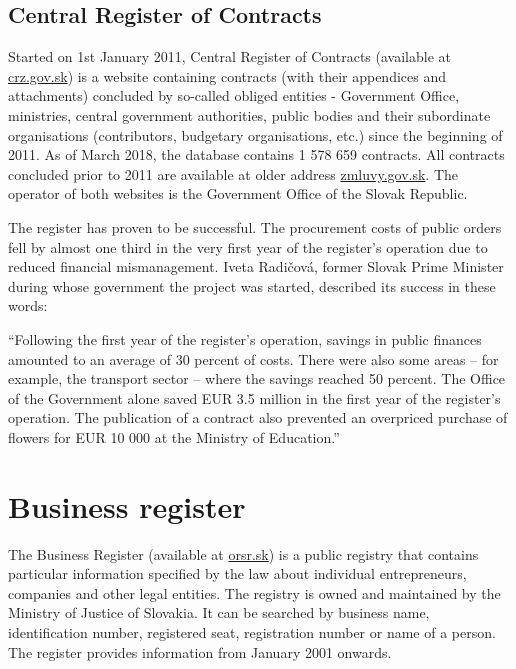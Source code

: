 \documentclass[thesis=B,english]{FITthesis}[2012/06/26]
\begin{document}
    \subsection{Central Register of Contracts}
    \label{crz}
    	Started on 1st January 2011, Central Register of Contracts (available at \href{https://www.crz.gov.sk}{crz.gov.sk}) is a website containing contracts (with their appendices and  attachments) concluded by so-called obliged entities - Government Office, ministries, central government authorities, public bodies and their subordinate organisations (contributors, budgetary organisations, etc.) since the beginning of 2011. As of March 2018, the database contains 1 578 659 contracts. All contracts concluded prior to 2011 are available at older address \href{http://www.zmluvy.gov.sk}{zmluvy.gov.sk}. The operator of both websites is the Government Office of the Slovak Republic. 
    	
    	The register has proven to be successful. The procurement costs of public orders fell by almost one third in the very first year of the register’s operation due to reduced financial mismanagement. Iveta Radičová, former Slovak Prime Minister during whose government the project was started, described its success in these words:
\begin{displayquote}“Following the first year of the register’s operation, savings in public finances amounted to an average of 30 percent of costs. There were also some areas – for example, the transport sector – where the savings reached 50 percent. The Office of the Government alone saved EUR 3.5 million in the first year of the register’s operation. The publication of a contract also prevented an overpriced purchase of flowers for EUR 10 000 at the Ministry of Education.”\cite{joinupcrz}
\end{displayquote}
    \section{Business register}
    \label{businessregister}
     The Business Register (available at \href{http://www.orsr.sk}{orsr.sk}) is a public registry that contains particular information specified by the law about individual entrepreneurs, companies and other legal entities. The registry is owned and maintained by the Ministry of Justice of Slovakia. It can be searched by business name, identification number, registered seat, registration number or name of a person. The register provides information from January 2001 onwards.
\end{document}
